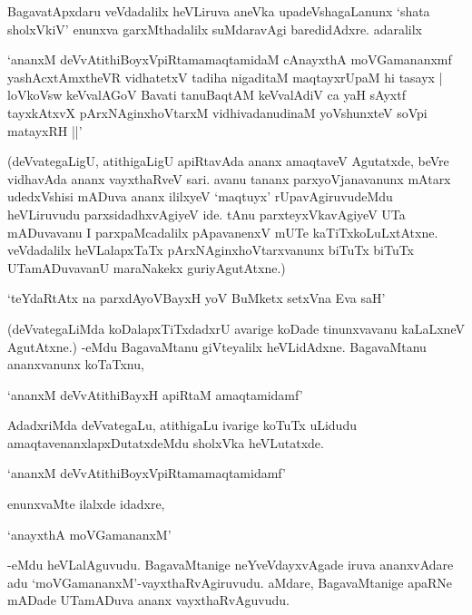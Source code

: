 BagavatApxdaru veVdadalilx heVLiruva aneVka upadeVshagaLanunx `shata sholxVkiV' enunxva garxMthadalilx suMdaravAgi baredidAdxre. adaralilx

\begin{shloka}
`ananxM deVvAtithiBoyxV\s piRtamamaqtamidaM cAnayxthA moVGamananxmf\\
yashAcxtAmxtheVR vidhatetxV tadiha nigaditaM maqtayxrUpaM hi tasayx |\\
loVkoV\s sw keVvalAGoV Bavati tanuBaqtAM keVvalAdiV ca yaH sAyxtf\\
tayxkAtxvX pArxNAginxhoVtarxM vidhivadanudinaM yoV\s shunxteV soV\s pi matayxRH ||'
\end{shloka}

(deVvategaLigU, atithigaLigU apiRtavAda ananx amaqtaveV Agutatxde, beVre vidhavAda ananx vayxthaRveV sari. avanu tananx parxyoVjanavanunx mAtarx udedxVshisi mADuva ananx ililxyeV `maqtuyx' rUpavAgiruvudeMdu heVLiruvudu parxsidadhxvAgiyeV ide. tAnu parxteyxVkavAgiyeV UTa mADuvavanu I parxpaMcadalilx pApavanenxV mUTe kaTiTxkoLuLxtAtxne. veVdadalilx heVLalapxTaTx pArxNAginxhoVtarxvanunx biTuTx biTuTx UTamADuvavanU maraNakekx guriyAgutAtxne.)

\begin{shloka}
`teYdaRtAtx na parxdAyoVBayxH yoV BuMketx setxVna Eva saH'
\end{shloka}

(deVvategaLiMda koDalapxTiTxdadxrU avarige koDade tinunxvavanu kaLaLxneV AgutAtxne.) -eMdu BagavaMtanu giVteyalilx heVLidAdxne. BagavaMtanu ananxvanunx koTaTxnu,

\begin{shloka}
`ananxM deVvAtithiBayxH apiRtaM amaqtamidamf'
\end{shloka}

AdadxriMda deVvategaLu, atithigaLu ivarige koTuTx uLidudu amaqtavenanxlapxDutatxdeMdu sholxVka heVLutatxde.

\begin{shloka}
`ananxM deVvAtithiBoyxV\s piRtamamaqtamidamf'
\end{shloka}

enunxvaMte ilalxde idadxre,

\begin{shloka}
`anayxthA moVGamananxM'
\end{shloka}

-eMdu heVLalAguvudu. BagavaMtanige neYveVdayxvAgade iruva ananxvAdare adu `moVGamananxM'-vayxthaRvAgiruvudu. aMdare, BagavaMtanige apaRNe mADade UTamADuva ananx vayxthaRvAguvudu.

